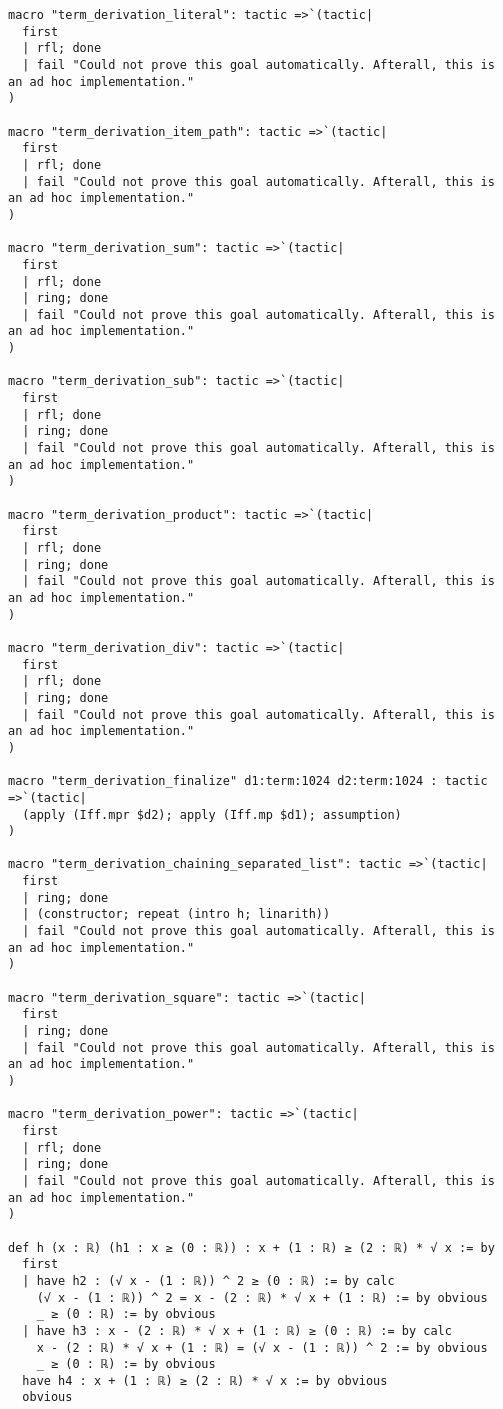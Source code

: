 \documentclass{article}
\begin{document}
\begin{tcolorbox}[colback=white!10, width=\linewidth]
\begin{lstlisting}[language=Lean4]
macro "term_derivation_literal": tactic =>`(tactic|
  first
  | rfl; done
  | fail "Could not prove this goal automatically. Afterall, this is an ad hoc implementation."
)

macro "term_derivation_item_path": tactic =>`(tactic|
  first
  | rfl; done
  | fail "Could not prove this goal automatically. Afterall, this is an ad hoc implementation."
)

macro "term_derivation_sum": tactic =>`(tactic|
  first
  | rfl; done
  | ring; done
  | fail "Could not prove this goal automatically. Afterall, this is an ad hoc implementation."
)

macro "term_derivation_sub": tactic =>`(tactic|
  first
  | rfl; done
  | ring; done
  | fail "Could not prove this goal automatically. Afterall, this is an ad hoc implementation."
)

macro "term_derivation_product": tactic =>`(tactic|
  first
  | rfl; done
  | ring; done
  | fail "Could not prove this goal automatically. Afterall, this is an ad hoc implementation."
)

macro "term_derivation_div": tactic =>`(tactic|
  first
  | rfl; done
  | ring; done
  | fail "Could not prove this goal automatically. Afterall, this is an ad hoc implementation."
)

macro "term_derivation_finalize" d1:term:1024 d2:term:1024 : tactic =>`(tactic|
  (apply (Iff.mpr $d2); apply (Iff.mp $d1); assumption)
)

macro "term_derivation_chaining_separated_list": tactic =>`(tactic|
  first
  | ring; done
  | (constructor; repeat (intro h; linarith))
  | fail "Could not prove this goal automatically. Afterall, this is an ad hoc implementation."
)

macro "term_derivation_square": tactic =>`(tactic|
  first
  | ring; done
  | fail "Could not prove this goal automatically. Afterall, this is an ad hoc implementation."
)

macro "term_derivation_power": tactic =>`(tactic|
  first
  | rfl; done
  | ring; done
  | fail "Could not prove this goal automatically. Afterall, this is an ad hoc implementation."
)

def h (x : ℝ) (h1 : x ≥ (0 : ℝ)) : x + (1 : ℝ) ≥ (2 : ℝ) * √ x := by
  first
  | have h2 : (√ x - (1 : ℝ)) ^ 2 ≥ (0 : ℝ) := by calc
    (√ x - (1 : ℝ)) ^ 2 = x - (2 : ℝ) * √ x + (1 : ℝ) := by obvious
    _ ≥ (0 : ℝ) := by obvious
  | have h3 : x - (2 : ℝ) * √ x + (1 : ℝ) ≥ (0 : ℝ) := by calc
    x - (2 : ℝ) * √ x + (1 : ℝ) = (√ x - (1 : ℝ)) ^ 2 := by obvious
    _ ≥ (0 : ℝ) := by obvious
  have h4 : x + (1 : ℝ) ≥ (2 : ℝ) * √ x := by obvious
  obvious

\end{lstlisting}
\end{tcolorbox}
\end{document}

